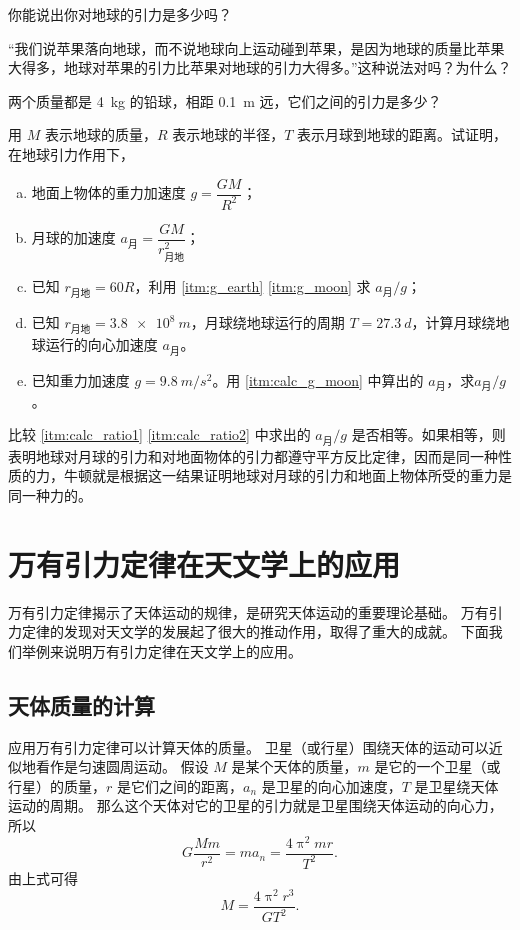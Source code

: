 \begin{Practice}
\begin{question}
	\item 你能说出你对地球的引力是多少吗？
	\item “我们说苹果落向地球，而不说地球向上运动碰到苹果，是因为地球的质量比苹果大得多，地球对苹果的引力比苹果对地球的引力大得多。”这种说法对吗？为什么？
	\item 两个质量都是 \qty{4}{kg} 的铅球，相距 \qty{0.1}{m} 远，它们之间的引力是多少？
	\item 用 $M$ 表示地球的质量，$R$ 表示地球的半径，$T$ 表示月球到地球的距离。试证明，在地球引力作用下，
	\begin{enumerate}[(a),itemsep=5pt]
		\item\label{itm:g_earth} 地面上物体的重力加速度 $g=\dfrac{GM}{R^2}$；
		\item\label{itm:g_moon} 月球的加速度 $a_{\text{月}}=\dfrac{GM}{r^2_{\text{月地}}}$；
		\item\label{itm:calc_ratio1} 已知 $r_{\text{月地}}=60R$，利用 \ref{itm:g_earth} \ref{itm:g_moon} 求 $a_{\text{月}}/g$；
		\item\label{itm:calc_g_moon} 已知 $r_{\text{月地}}=\qty{3.8e8}{m}$，月球绕地球运行的周期 $T=\qty{27.3}{d}$，计算月球绕地球运行的向心加速度 $a_{\text{月}}$。
		\item\label{itm:calc_ratio2} 已知重力加速度 $g=\qty{9.8}{m/s^2}$。用 \ref{itm:calc_g_moon} 中算出的 $a_{\text{月}}$，求$a_{\text{月}}/g$。
	\end{enumerate}
	比较 \ref{itm:calc_ratio1} \ref{itm:calc_ratio2} 中求出的 $a_{\text{月}}/g$ 是否相等。如果相等，则表明地球对月球的引力和对地面物体的引力都遵守平方反比定律，因而是同一种性质的力，牛顿就是根据这一结果证明地球对月球的引力和地面上物体所受的重力是同一种力的。
\end{question}
\end{Practice}

\section{万有引力定律在天文学上的应用}
万有引力定律揭示了天体运动的规律，是研究天体运动的重要理论基础。
万有引力定律的发现对天文学的发展起了很大的推动作用，取得了重大的成就。
下面我们举例来说明万有引力定律在天文学上的应用。

\subsection{天体质量的计算} 
应用万有引力定律可以计算天体的质量。
卫星（或行星）围绕天体的运动可以近似地看作是匀速圆周运动。
假设 $M$ 是某个天体的质量，$m$ 是它的一个卫星（或行星）的质量，$r$ 是它们之间的距离，$a_n$ 是卫星的向心加速度，$T$ 是卫星绕天体运动的周期。
那么这个天体对它的卫星的引力就是卫星围绕天体运动的向心力，所以
\[G\frac{Mm}{r^2}=ma_n=\frac{4\uppi^2 mr}{T^2}.\]
由上式可得
\[M=\frac{4\uppi^2r^3}{GT^2}.\]

